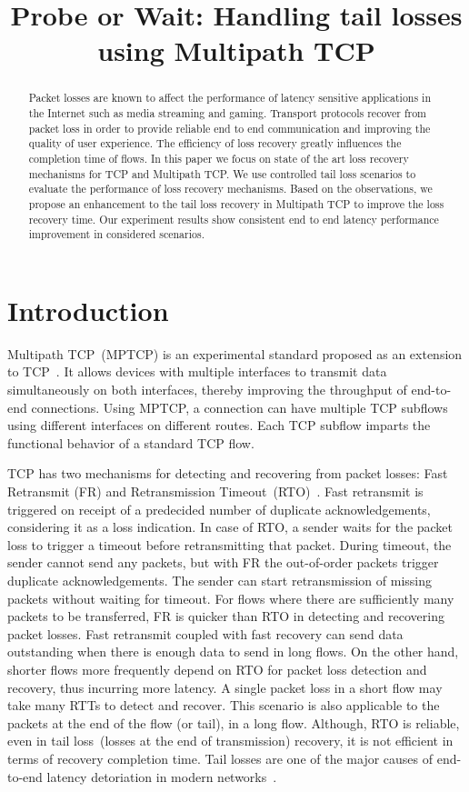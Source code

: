 \documentclass[10pt,conference,compsoc]{IEEEtran}
\title{Probe or Wait: Handling tail losses using Multipath TCP}
\author{\IEEEauthorblockN{Kiran~Yedugundla, Per~Hurtig, Anna~Brunstrom}
\IEEEauthorblockA{Dept. of Computer Science, Karlstad University, Karlstad, Sweden}}
\begin{document}
\maketitle

\begin{abstract}
Packet losses are known to affect the performance of latency sensitive applications in the Internet such as media streaming and gaming. Transport protocols recover from packet loss in order to provide reliable end to end communication and improving the quality of user experience. The efficiency of loss recovery greatly influences the completion time of flows. In this paper we focus on state of the art loss recovery mechanisms for TCP and Multipath TCP. We use controlled tail loss scenarios to evaluate the performance of loss recovery mechanisms. Based on the observations, we propose an enhancement to the tail loss recovery in Multipath TCP to improve the loss recovery time. Our experiment results show consistent end to end latency performance improvement in considered scenarios. 
\end{abstract}

\section{Introduction}


Multipath TCP~(MPTCP) is an experimental standard proposed as an extension to TCP~\cite{rfc6824}. It allows devices with multiple interfaces to transmit data simultaneously on both interfaces, thereby improving the throughput of end-to-end connections. Using MPTCP, a connection can have multiple TCP subflows using different interfaces on different routes. Each TCP subflow imparts the functional behavior of a standard TCP flow. 

TCP has two mechanisms for detecting and recovering from packet losses: Fast Retransmit (FR) and Retransmission Timeout~(RTO)~\cite{Flach:2013}. Fast retransmit is triggered on receipt of a predecided number of duplicate acknowledgements, considering it as a loss indication. In case of RTO, a sender waits for the packet loss to trigger a timeout before retransmitting that packet. During timeout, the sender cannot send any packets, but with FR the out-of-order packets trigger duplicate acknowledgements. The sender can start retransmission of missing packets without waiting for timeout. For flows where there are sufficiently many packets to be transferred, FR is quicker than RTO in detecting and recovering packet losses. Fast retransmit coupled with fast recovery can send data outstanding when there is enough data to send in long flows. On the other hand, shorter flows more frequently depend on RTO for packet loss detection and recovery, thus incurring more latency. A single packet loss in a short flow may take many RTTs to detect and recover. This scenario is also applicable to the packets at the end of the flow (or tail), in a long flow. Although, RTO is reliable, even in tail loss~(losses at the end of transmission) recovery, it is not efficient in terms of recovery completion time. Tail losses are one of the major causes of end-to-end latency detoriation in modern networks~\cite{Flach:2013}. 
\end{document}

